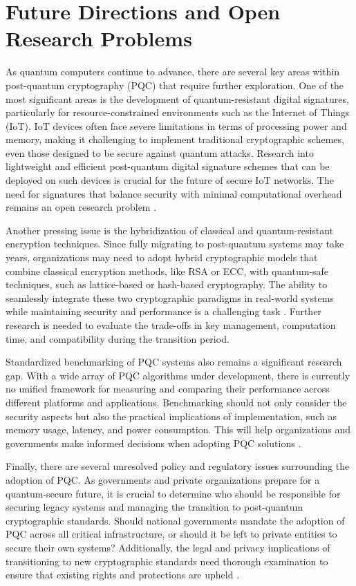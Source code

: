 \documentclass[conference]{IEEEtran}
\begin{document}
\section{Future Directions and Open Research Problems}

As quantum computers continue to advance, there are several key areas within post-quantum cryptography (PQC) that require further exploration. One of the most significant areas is the development of quantum-resistant digital signatures, particularly for resource-constrained environments such as the Internet of Things (IoT). IoT devices often face severe limitations in terms of processing power and memory, making it challenging to implement traditional cryptographic schemes, even those designed to be secure against quantum attacks. Research into lightweight and efficient post-quantum digital signature schemes that can be deployed on such devices is crucial for the future of secure IoT networks. The need for signatures that balance security with minimal computational overhead remains an open research problem \cite{IoT_Challenge}.

Another pressing issue is the hybridization of classical and quantum-resistant encryption techniques. Since fully migrating to post-quantum systems may take years, organizations may need to adopt hybrid cryptographic models that combine classical encryption methods, like RSA or ECC, with quantum-safe techniques, such as lattice-based or hash-based cryptography. The ability to seamlessly integrate these two cryptographic paradigms in real-world systems while maintaining security and performance is a challenging task \cite{HybridModels}. Further research is needed to evaluate the trade-offs in key management, computation time, and compatibility during the transition period.

Standardized benchmarking of PQC systems also remains a significant research gap. With a wide array of PQC algorithms under development, there is currently no unified framework for measuring and comparing their performance across different platforms and applications. Benchmarking should not only consider the security aspects but also the practical implications of implementation, such as memory usage, latency, and power consumption. This will help organizations and governments make informed decisions when adopting PQC solutions \cite{BenchmarkingPQC}.

Finally, there are several unresolved policy and regulatory issues surrounding the adoption of PQC. As governments and private organizations prepare for a quantum-secure future, it is crucial to determine who should be responsible for securing legacy systems and managing the transition to post-quantum cryptographic standards. Should national governments mandate the adoption of PQC across all critical infrastructure, or should it be left to private entities to secure their own systems? Additionally, the legal and privacy implications of transitioning to new cryptographic standards need thorough examination to ensure that existing rights and protections are upheld \cite{PQC_Policy}.
\end{document}
